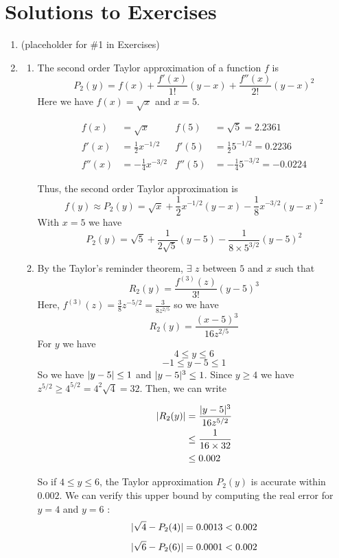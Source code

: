 \section{Solutions to Exercises}
\begin{enumerate}
\item (placeholder for \#1 in Exercises)    
\item 
    \begin{enumerate}
        \item The second order Taylor approximation of a function $f$ is
            $$P_2(y) = f(x) + \frac{f'(x)}{1!}(y-x) + \frac{f''(x)}{2!}(y-x)^2$$
            Here we have $f(x) = \sqrt{x}$ and $x = 5$.
            \begin{ceqn}
                \begin{align*}
                    f(x) &= \sqrt{x} & f(5) &= \sqrt{5} = 2.2361 \\
                    f'(x) &= \frac{1}{2}x^{-1/2} & f'(5) &= \frac{1}{2}5^{-1/2} = 0.2236 \\
                    f''(x) &= -\frac{1}{4}x^{-3/2} & f''(5) &= -\frac{1}{4}5^{-3/2} = -0.0224
                \end{align*}
            \end{ceqn}
            Thus, the second order Taylor approximation is 
            $$f(y) \approx P_2(y) = \sqrt{x} + \frac{1}{2}x^{-1/2}(y-x) - \frac{1}{8}x^{-3/2}(y-x)^2$$
            With $x=5$ we have
            $$P_2(y) = \sqrt{5} + \frac{1}{2\sqrt{5}}(y-5) - \frac{1}{8\times 5^{3/2}}(y-5)^2$$
        \item By the Taylor's reminder theorem, $\exists$ $z$ between $5$ and $x$ such that 
            $$R_2(y) = \frac{f^{(3)}(z)}{3!}(y-5)^3$$
            Here, $f^{(3)}(z) = \frac{3}{8}z^{-5/2} = \frac{3}{8z^{2/5}}$ so we have
            $$R_2(y) = \frac{(x-5)^3}{16z^{2/5}}$$
            For $y$ we have
            $$4 \leq y \leq 6$$
            $$-1 \leq y - 5 \leq 1$$
            So we have $\abs{y-5} \leq 1$ and $\abs{y-5}^3 \leq 1$. Since $y \geq 4$ we have $z^{5/2} \geq 4^{5/2} = 4^2\sqrt{4} = 32$.
            Then, we can write
            \begin{ceqn}
                \begin{align*}
                    \abs{R_2(y)} &= \frac{\abs{y-5}^3}{16z^{5/2}} \\
                    &\leq \frac{1}{16 \times 32} \\
                    &\leq 0.002
                \end{align*}
            \end{ceqn}
            So if $4 \leq y \leq 6$, the Taylor approximation $P_2(y)$ is accurate within $0.002$. We can verify this upper bound by computing the real error for $y=4$ and $y=6$ :
            $$\abs{\sqrt{4} - P_2(4)} = 0.0013 < 0.002$$
            $$\abs{\sqrt{6} - P_2(6)} = 0.0001 < 0.002$$
    \end{enumerate}


\end{enumerate}

